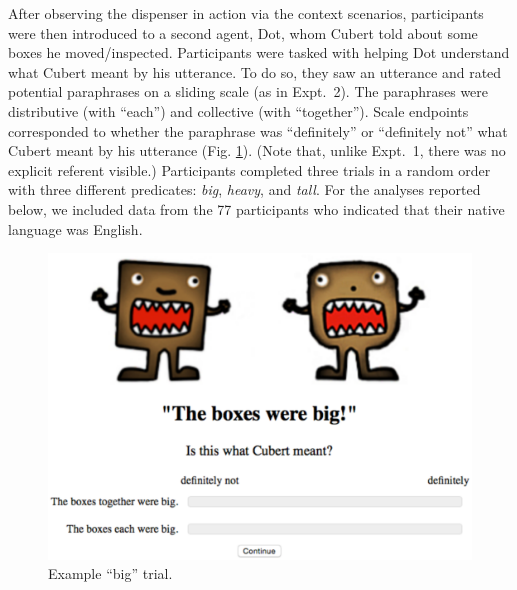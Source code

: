 \documentclass[preprint,12pt,authoryear,titlepage]{elsarticle}
\newcommand{\ndg}[1]{\textcolor{Green}{[ndg: #1]}}
\begin{document}
After observing the dispenser in action via the context  scenarios, participants were then introduced to a second agent, Dot, whom Cubert told about some boxes he moved/inspected. Participants were tasked with helping Dot understand what Cubert meant by his utterance. To do so, they saw an utterance and rated potential paraphrases on a sliding scale (as in Expt.~2). The paraphrases were distributive (with  ``each'') and collective (with ``together'').  Scale endpoints corresponded to whether the paraphrase was ``definitely'' or ``definitely not'' what Cubert meant by his utterance (Fig. \ref{trial}). (Note that, unlike Expt.~1, there was no explicit referent visible.) Participants completed three trials in a random order with three different predicates: \emph{big}, \emph{heavy}, and \emph{tall}. For the analyses reported below, we included data from the 77 participants who indicated that their native language was English.


\begin{figure}[h]
	\centering
	\includegraphics[width=4.5in]{images/trial.eps}
	\caption{Example ``big'' trial.}\label{trial}
\end{figure}
\end{document}
